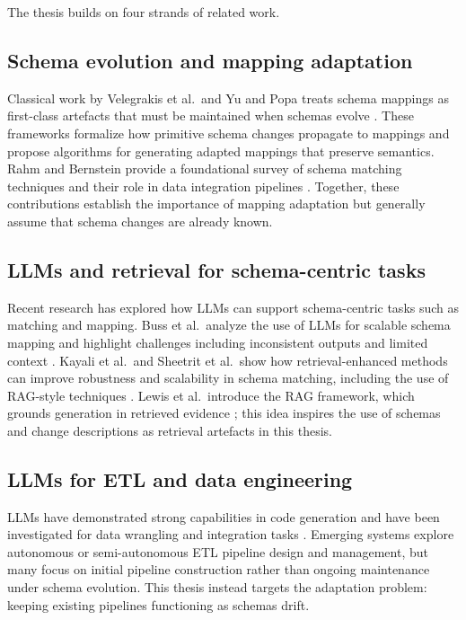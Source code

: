 The thesis builds on four strands of related work.

\subsection{Schema evolution and mapping adaptation}

Classical work by Velegrakis et al.\ and Yu and Popa treats schema mappings as
first-class artefacts that must be maintained when schemas evolve
\cite{velegrakis2003mapping,yu2005semantic}. These frameworks formalize how
primitive schema changes propagate to mappings and propose algorithms for
generating adapted mappings that preserve semantics. Rahm and Bernstein provide
a foundational survey of schema matching techniques and their role in data
integration pipelines \cite{rahm2001survey}. Together, these contributions
establish the importance of mapping adaptation but generally assume that schema
changes are already known.

\subsection{LLMs and retrieval for schema-centric tasks}

Recent research has explored how LLMs can support schema-centric tasks such as
matching and mapping. Buss et al.\ analyze the use of LLMs for scalable schema
mapping and highlight challenges including inconsistent outputs and limited
context \cite{buss2025towards}. Kayali et al.\ and Sheetrit et al.\ show how
retrieval-enhanced methods can improve robustness and scalability in schema
matching, including the use of RAG-style techniques
\cite{kayali2024mind,sheetrit2024rematch}. Lewis et al.\ introduce the RAG
framework, which grounds generation in retrieved evidence
\cite{lewis2020retrieval}; this idea inspires the use of schemas and change
descriptions as retrieval artefacts in this thesis.

\subsection{LLMs for ETL and data engineering}

LLMs have demonstrated strong capabilities in code generation
\cite{chen2021evaluating} and have been investigated for data wrangling and
integration tasks \cite{narayan2022foundation}. Emerging systems explore
autonomous or semi-autonomous ETL pipeline design and management, but many
focus on initial pipeline construction rather than ongoing maintenance under
schema evolution. This thesis instead targets the adaptation problem: keeping
existing pipelines functioning as schemas drift.

